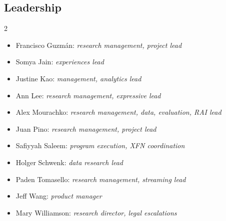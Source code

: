 \subsection*{Leadership}
\vspace{-5pt}
\begin{multicols}{2}    
\begin{itemize}[itemsep=0.00cm,parsep=0.0cm,left=0pt, label={}]
\item Francisco Guzm\'an: \textit{research management, project lead}
\item Somya Jain: \textit{experiences lead}
\item Justine Kao: \textit{management, analytics lead}

\item Ann Lee: \textit{research management, expressive lead}
\item Alex Mourachko: \textit{research management, data, evaluation, RAI lead}
\columnbreak

\item Juan Pino: \textit{research management, project lead}
\item Safiyyah Saleem: \textit{program execution, XFN coordination }

\item Holger Schwenk: \textit{data research lead}
\item Paden Tomasello: \textit{research management, streaming lead}

\item Jeff Wang: \textit{product manager }
\item Mary Williamson:  \textit{research director, legal escalations}
\end{itemize}

\end{multicols}

\newpage 

